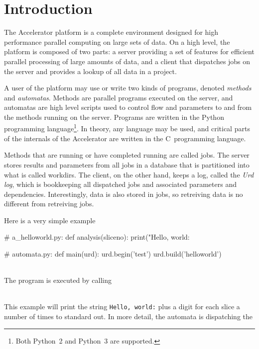 
\section{Introduction}

The Accelerator platform is a complete environment designed for high
performance parallel computing on large sets of data.  On a high
level, the platform is composed of two parts: a server providing a set
of features for efficient parallel processing of large amounts of
data, and a client that dispatches jobs on the server and provides a
lookup of all data in a project.

A user of the platform may use or write two kinds of programs, denoted
\textsl{methods} and \textsl{automatas}.  Methods are parallel
programs executed on the server, and automatas are high level scripts
used to control flow and parameters to and from the methods running on
the server.  Programs are written in the Python programming
language\footnote{ Both Python~2 and Python~3 are supported.}.  In
theory, any language may be used, and critical parts of the internals
of the Accelerator are written in the C~programming language.

Methods that are running or have completed running are called jobs.
The server stores results and parameters from all jobs in a database
that is partitioned into what is called workdirs.  The client, on the
other hand, keeps a log, called the \textsl{Urd log}, which is
bookkeeping all dispatched jobs and associated parameters and
dependencies.  Interestingly, data is also stored in jobs, so
retreiving data is no different from retreiving jobs.

Here is a very simple example
\\
\begin{python}
# a_helloworld.py:
def analysis(sliceno):
  print("Hello, world: %

# automata.py:
def main(urd):
  urd.begin('test')
  urd.build('helloworld')
\end{python}
\\
The program is executed by calling
\\
\begin{shell}
\end{shell}
\\
This example will print the string \texttt{Hello, world:} plus a digit
for each slice a number of
times to standard
out.  In more detail, the automata is dispatching the




